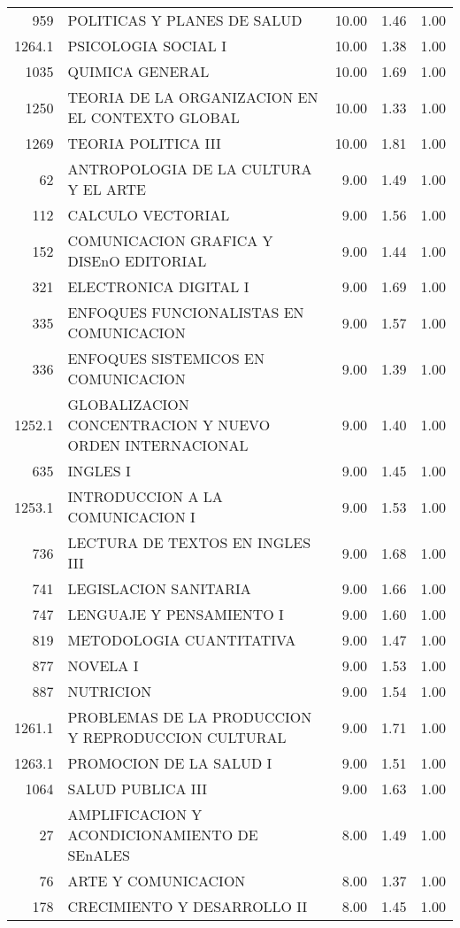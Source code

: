 \documentclass[12pt]{article}
\begin{document}
\begin{table}[ht]
\begin{tabular}{rlrrr}
  959 & POLITICAS Y PLANES DE SALUD & 10.00 & 1.46 & 1.00 \\ 
  1264.1 & PSICOLOGIA SOCIAL I & 10.00 & 1.38 & 1.00 \\ 
  1035 & QUIMICA GENERAL & 10.00 & 1.69 & 1.00 \\ 
  1250 & TEORIA DE LA ORGANIZACION EN EL CONTEXTO GLOBAL & 10.00 & 1.33 & 1.00 \\ 
  1269 & TEORIA POLITICA III & 10.00 & 1.81 & 1.00 \\ 
  62 & ANTROPOLOGIA DE LA CULTURA Y EL ARTE & 9.00 & 1.49 & 1.00 \\ 
  112 & CALCULO VECTORIAL & 9.00 & 1.56 & 1.00 \\ 
  152 & COMUNICACION GRAFICA Y DISEnO EDITORIAL & 9.00 & 1.44 & 1.00 \\ 
  321 & ELECTRONICA DIGITAL I & 9.00 & 1.69 & 1.00 \\ 
  335 & ENFOQUES FUNCIONALISTAS EN COMUNICACION & 9.00 & 1.57 & 1.00 \\ 
  336 & ENFOQUES SISTEMICOS EN COMUNICACION & 9.00 & 1.39 & 1.00 \\ 
  1252.1 & GLOBALIZACION CONCENTRACION Y NUEVO ORDEN INTERNACIONAL & 9.00 & 1.40 & 1.00 \\ 
  635 & INGLES I & 9.00 & 1.45 & 1.00 \\ 
  1253.1 & INTRODUCCION A LA COMUNICACION I & 9.00 & 1.53 & 1.00 \\ 
  736 & LECTURA DE TEXTOS EN INGLES III & 9.00 & 1.68 & 1.00 \\ 
  741 & LEGISLACION SANITARIA & 9.00 & 1.66 & 1.00 \\ 
  747 & LENGUAJE Y PENSAMIENTO I & 9.00 & 1.60 & 1.00 \\ 
  819 & METODOLOGIA CUANTITATIVA & 9.00 & 1.47 & 1.00 \\ 
  877 & NOVELA I & 9.00 & 1.53 & 1.00 \\ 
  887 & NUTRICION & 9.00 & 1.54 & 1.00 \\ 
  1261.1 & PROBLEMAS DE LA PRODUCCION Y REPRODUCCION CULTURAL & 9.00 & 1.71 & 1.00 \\ 
  1263.1 & PROMOCION DE LA SALUD I & 9.00 & 1.51 & 1.00 \\ 
  1064 & SALUD PUBLICA III & 9.00 & 1.63 & 1.00 \\ 
  27 & AMPLIFICACION Y ACONDICIONAMIENTO DE SEnALES & 8.00 & 1.49 & 1.00 \\ 
  76 & ARTE Y COMUNICACION & 8.00 & 1.37 & 1.00 \\ 
  178 & CRECIMIENTO Y DESARROLLO II & 8.00 & 1.45 & 1.00 \\ 

\end{tabular}
\end{table}
\end{document}
